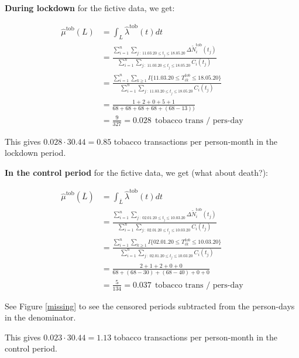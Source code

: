 \documentclass[
  11pt,
]{article}
\begin{document}
\textbf{During lockdown} for the fictive data, we get:

\begin{align*}
\hat{\mu}^{\text{tob}}(L) &= \int_L \hat{\lambda}^{\text{tob}} (t) dt \\
&=\frac{\sum_{i=1}^n \sum_{j \ : \ 11.03.20 \leq t_j \leq 18.05.20} \Delta \tilde{N}_i^{\text{tob}}(t_j)}{\sum_{i=1}^n \sum_{j \ : \  11.03.20 \leq t_j \leq 18.05.20} C_i(t_j)} \\
&=\frac{\sum_{i=1}^n \sum_{k \geq 1} I \{11.03.20 \leq T^{tob}_{ik} \leq 18.05.20\}}{\sum_{i=1}^n \sum_{j \ : \ 11.03.20 \leq t_j \leq 18.05.20} C_i(t_j)} \\
&=\frac{1+2+0+5+1}{68+68+68+68+(68-13))} \\
&=\frac{9}{327} = 0.028 \ \ \text{tobacco trans / pers-day}
\end{align*}

This gives \(0.028 \cdot 30.44 = 0.85\) tobacco transactions per
person-month in the lockdown period.

\textbf{In the control period} for the fictive data, we get (what about
death?):

\begin{align*}
\hat{\mu}^{\text{tob}}(\overline{L}) &= \int_{\overline{L}} \hat{\lambda}^{\text{tob}} (t) dt \\
&=\frac{\sum_{i=1}^n \sum_{j \ : \ 02.01.20 \leq t_j \leq 10.03.20} \Delta \tilde{N}_i^{\text{tob}}(t_j)}{\sum_{i=1}^n \sum_{j \ : \  02.01.20 \leq t_j \leq 10.03.20} C_i(t_j)} \\
&=\frac{\sum_{i=1}^n \sum_{k \geq 1} I \{02.01.20 \leq T^{tob}_{ik} \leq 10.03.20\}}{\sum_{i=1}^n \sum_{j \ : \ 02.01.20 \leq t_j \leq 10.03.20} C_i(t_j)} \\
&=\frac{2+1+2+0+0}{68+(68-30)+(68-40)+0+0} \\
&=\frac{5}{134}=0.037 \ \ \text{tobacco trans / pers-day}
\end{align*}

See Figure \ref{missing} to see the censored periods subtracted from the
person-days in the denominator.

This gives \(0.023 \cdot 30.44 = 1.13\) tobacco transactions per
person-month in the control period.

\newpage
\end{document}
